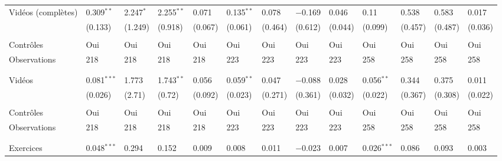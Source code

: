 \documentclass[
]{book}
\begin{document}
\begin{landscape}
\begin{ThreePartTable}
\begin{longtable}[t]{lllllllllllll}
\hline
\hspace{1em}Vidéos (complètes) & 0.309$^{**}$ & 2.247$^{*}$ & 2.255$^{**}$ & 0.071 & 0.135$^{**}$ & 0.078 & $-$0.169 & 0.046 & 0.11 & 0.538 & 0.583 & 0.017\\
\hspace{1em} & (0.133) & (1.249) & (0.918) & (0.067) & (0.061) & (0.464) & (0.612) & (0.044) & (0.099) & (0.457) & (0.487) & (0.036)\\
\hspace{1em} &  &  &  &  &  &  &  &  &  &  &  \vphantom{4} & \\
\hspace{1em}Contrôles & Oui & Oui & Oui & Oui & Oui & Oui & Oui & Oui & Oui & Oui & Oui & \vphantom{2} Oui\\
\hspace{1em}Observations & 218 & 218 & 218 & 218 & 223 & 223 & 223 & 223 & 258 & 258 & 258 & \vphantom{2} 258\\
\hspace{1em} &  &  &  &  &  &  &  &  &  &  &  \vphantom{3} & \\
\addlinespace[0.3em]
\multicolumn{13}{l}{\textbf{Panel D : Vidéos}}\\
\hline
\hspace{1em}Vidéos & 0.081$^{***}$ & 1.773 & 1.743$^{**}$ & 0.056 & 0.059$^{**}$ & 0.047 & $-$0.088 & 0.028 & 0.056$^{**}$ & 0.344 & 0.375 & 0.011\\
\hspace{1em} & (0.026) & (2.71) & (0.72) & (0.092) & (0.023) & (0.271) & (0.361) & (0.032) & (0.022) & (0.367) & (0.308) & (0.022)\\
\hspace{1em} &  &  &  &  &  &  &  &  &  &  &  \vphantom{2} & \\
\hspace{1em}Contrôles & Oui & Oui & Oui & Oui & Oui & Oui & Oui & Oui & Oui & Oui & Oui & \vphantom{1} Oui\\
\hspace{1em}Observations & 218 & 218 & 218 & 218 & 223 & 223 & 223 & 223 & 258 & 258 & 258 & \vphantom{1} 258\\
\hspace{1em} &  &  &  &  &  &  &  &  &  &  &  \vphantom{1} & \\
\addlinespace[0.3em]
\multicolumn{13}{l}{\textbf{Panel E : Exercices}}\\
\hline
\hspace{1em}Exercices & 0.048$^{***}$ & 0.294 & 0.152 & 0.009 & 0.008 & 0.011 & $-$0.023 & 0.007 & 0.026$^{***}$ & 0.086 & 0.093 & 0.003\\

\end{longtable}
\end{ThreePartTable}
\end{landscape}
\end{document}
